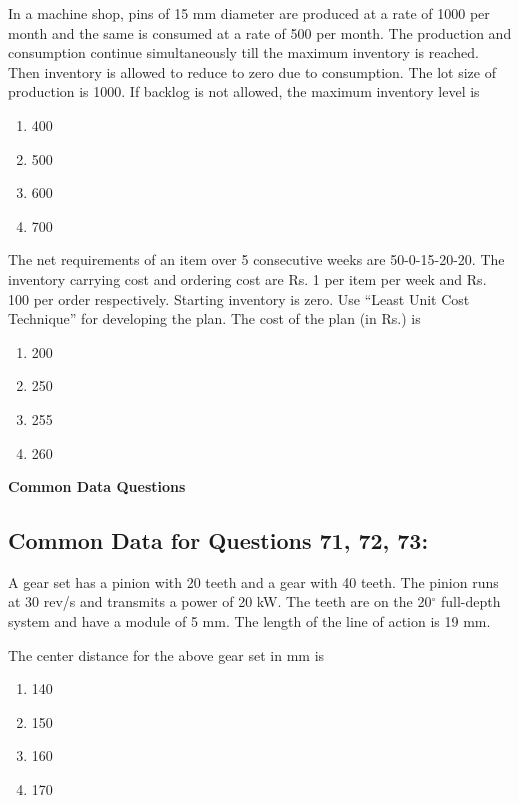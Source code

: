 \iffalse
\title{Assignment Gate}
\author{RONGALI CHARAN}
\section{me}
\chapter{2007}
\fi

\item In a machine shop, pins of 15 mm diameter are produced at a rate of 1000 per month and the same is consumed at a rate of 500 per month. The production and consumption continue simultaneously till the maximum inventory is reached. Then inventory is allowed to reduce to zero due to consumption. The lot size of production is 1000. If backlog is not allowed, the maximum inventory level is  
\begin{enumerate}
    \item 400
    \item 500
    \item 600
    \item 700
\end{enumerate}

\item The net requirements of an item over 5 consecutive weeks are 50-0-15-20-20. The inventory carrying cost and ordering cost are Rs. 1 per item per week and Rs. 100 per order respectively. Starting inventory is zero. Use ``Least Unit Cost Technique'' for developing the plan. The cost of the plan (in Rs.) is  
\begin{enumerate}
    \item 200
    \item 250
    \item 255
    \item 260
\end{enumerate}

\textbf{Common Data Questions}

\subsection{Common Data for Questions 71, 72, 73:}  
A gear set has a pinion with 20 teeth and a gear with 40 teeth. The pinion runs at 30 rev/s and transmits a power of 20 kW. The teeth are on the 20$^\circ$ full-depth system and have a module of 5 mm. The length of the line of action is 19 mm.

\item The center distance for the above gear set in mm is  
\begin{enumerate}
    \item 140
    \item 150
    \item 160
    \item 170
\end{enumerate}

